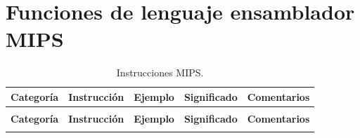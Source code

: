 \documentclass[12pt,a4paper]{article}
\begin{document}
	\clearpage
	
	\section*{Funciones de lenguaje ensamblador MIPS}
	

	\small
	\begin{xltabular}{\textwidth}{>{\raggedright\arraybackslash}p{2.2cm} | >{\raggedright\arraybackslash}p{2.2cm} | >{\raggedright\arraybackslash}p{3cm} | >{\raggedright\arraybackslash}p{3.5cm} X}
		\caption{Instrucciones MIPS.}\\
		\toprule
		\textbf{Categoría} & \textbf{Instrucción} & \textbf{Ejemplo} & \textbf{Significado} & \textbf{Comentarios} \\
		\midrule
		\endfirsthead 
		
		 \\
		\toprule
		\textbf{Categoría} & \textbf{Instrucción} & \textbf{Ejemplo} & \textbf{Significado} & \textbf{Comentarios} \\
		\midrule
		\endhead 
		
		\bottomrule
		\endfoot 
		\bottomrule
		\endlastfoot 
		

\end{xltabular}
\end{document}
